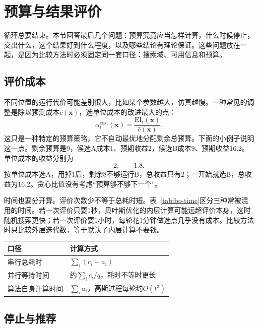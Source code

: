 \section{预算与结果评价}
\label{sec:bo-budget}

循环总要结束。本节回答最后几个问题：预算究竟应当怎样计算，什么时候停止，交出什么，这个结果好到什么程度，以及哪些结论有理论保证。这些问题放在一起，是因为比较方法时必须固定同一套口径：搜索域、可用信息和预算。

\subsection{评价成本}
\label{sec:bo-cost}

不同位置的运行代价可能差别很大，比如某个参数越大，仿真越慢。一种常见的调整是除以预测成本$\widehat{c}(\bm{x})$，选单位成本的改进最大的点：
\begin{equation}
 \alpha_t^{\mathrm{cost}}(\bm{x})=\frac{\mathrm{EI}_t(\bm{x})}{\widehat{c}(\bm{x})}.
 \label{eq:bo-cost-ei}
\end{equation}
这只是一种特定的预算策略，它不自动最优地分配剩余总预算。下面的小例子说明这一点。剩余预算是$9$，候选A成本$1$、预期收益$2$，候选B成本$9$、预期收益$16.2$。单位成本的收益分别为
\[
 2,\qquad1.8.
\]
按单位成本选A，用掉$1$后，剩余$8$不够运行B，总收益只有$2$；一开始就选B，总收益为$16.2$。贪心比值没有考虑“预算够不够下一个”。

时间也要分开算。评价次数少不等于总耗时短。表~\ref{tab:bo-time}区分三种常被混用的时间。若一次评价只要$1$秒，贝叶斯优化的内层计算可能远超评价本身，这时随机搜索更快；若一次评价要$1$小时，每轮花$1$分钟做选点几乎没有成本。比较方法时只比较外层迭代数，等于默认了内层计算不要钱。

\begin{BookInlineTable}
 \centering
 \caption{三种时间口径，$c_i$是第$i$次评价的耗时，$a_i$是第$i$轮算法计算的耗时，$q$是并行的机器数。}
 \label{tab:bo-time}
 \begin{tabular}{ll}
 \toprule
 口径&计算方式\\
 \midrule
 串行总耗时&$\sum_i(c_i+a_i)$\\
 并行等待时间&约$\sum_i c_i/q$，耗时不等时更长\\
 算法自身计算时间&$\sum_i a_i$，高斯过程每轮约$O(t^3)$\\
 \bottomrule
 \end{tabular}
\end{BookInlineTable}

\subsection{停止与推荐}
\label{sec:bo-stopping}

